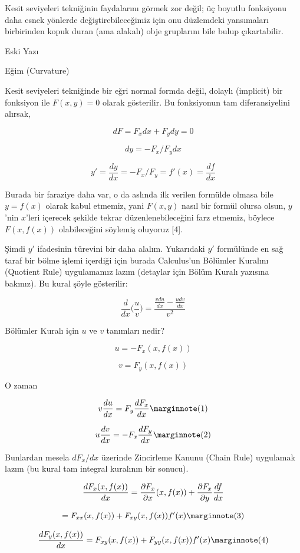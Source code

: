 \documentclass[12pt,fleqn]{article}\usepackage{../../common}
\begin{document}
Kesit seviyeleri tekniğinin faydalarını görmek zor değil; üç boyutlu fonksiyonu
daha esnek yönlerde değiştirebileceğimiz için onu düzlemdeki yansımaları
birbirinden kopuk duran (ama alakalı) obje gruplarını bile bulup çıkartabilir.


\newpage

Eski Yazı

Eğim (Curvature)

Kesit seviyeleri tekniğinde bir eğri normal formda değil, dolaylı
(implicit) bir fonksiyon ile $F(x,y) = 0$ olarak gösterilir. Bu fonksiyonun
tam diferansiyelini alırsak,

$$ dF = F_x dx + F_y dy = 0  $$

$$ dy = -F_x / F_y dx  $$

$$ y' = \frac{dy}{dx} = -F_x / F_y = f'(x) = \frac{df}{dx} $$

Burada bir faraziye daha var, o da aslında ilk verilen formülde olmasa bile
$y=f(x)$ olarak kabul etmemiz, yani $F(x,y)$ nasıl bir formül olursa olsun,
$y$'nin $x$'leri içerecek şekilde tekrar düzenlenebileceğini farz etmemiz,
böylece $F(x,f(x))$ olabileceğini söylemiş oluyoruz [4].

Şimdi $y'$ ifadesinin türevini bir daha alalım. Yukarıdaki $y'$ formülünde
en sağ taraf bir bölme işlemi içerdiği için burada Calculus'un Bölümler
Kuralını (Quotient Rule) uygulamamız lazım (detaylar için Bölüm Kuralı
yazısına bakınız). Bu kural şöyle gösterilir:

$$ \frac{d}{dx}\bigg(\frac{u}{v}\bigg) = 
\frac{\displaystyle \frac{v du}{dx} - \frac{u dv}{dx}}{v^2} $$

Bölümler Kuralı için $u$ ve $v$ tanımları nedir? 

$$ u = -F_x(x,f(x))  $$

$$ v = F_y(x,f(x)) $$

O zaman

$$ 
v \frac{du}{dx} = F_y \frac{dF_x}{dx} 
\mlabel{1}
$$

$$
u \frac{dv}{dx} = -F_x \frac{dF_y }{dx} 
\mlabel{2}
$$

Bunlardan mesela $dF_x/dx$ üzerinde Zincirleme Kanunu (Chain Rule) uygulamak
lazım (bu kural tam integral kuralının bir sonucu). 

$$ \frac{d F_x(x,f(x)) }{dx} = \frac{\partial F_x}{\partial  x}(x,f(x))+\frac{\partial F_x}{\partial y}\frac{df}{dx}\\ $$

$$
= F_{xx}(x,f(x))+F_{xy}(x,f(x))f'(x) 
\mlabel{3}
$$

$$
\frac{d F_y(x,f(x)) }{dx} =  F_{xy}(x,f(x))+F_{yy}(x,f(x))f'(x) 
\mlabel{4}
$$
\end{document}
